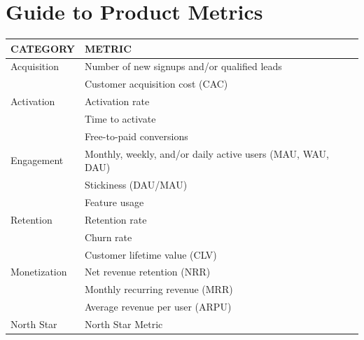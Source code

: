 \documentclass{tufte-handout}
\begin{document}
\pagebreak
\section{Guide to Product Metrics}
  \begin{table}[h]
    \centering
    \begin{tabular}{ll}
    \toprule
    \textbf{CATEGORY} & \textbf{METRIC} \\
    \midrule
    Acquisition & Number of new signups and/or qualified leads \\
                & Customer acquisition cost (CAC) \\
    Activation   & Activation rate \\
                & Time to activate \\
                & Free-to-paid conversions \\
    Engagement  & Monthly, weekly, and/or daily active users (MAU, WAU, DAU) \\
                & Stickiness (DAU/MAU) \\
                & Feature usage \\
    Retention    & Retention rate \\
                & Churn rate \\
                & Customer lifetime value (CLV) \\
    Monetization & Net revenue retention (NRR) \\
                & Monthly recurring revenue (MRR) \\
                & Average revenue per user (ARPU) \\
    North Star   & North Star Metric \\
    \bottomrule
    \end{tabular}
  \end{table}
\end{document}
